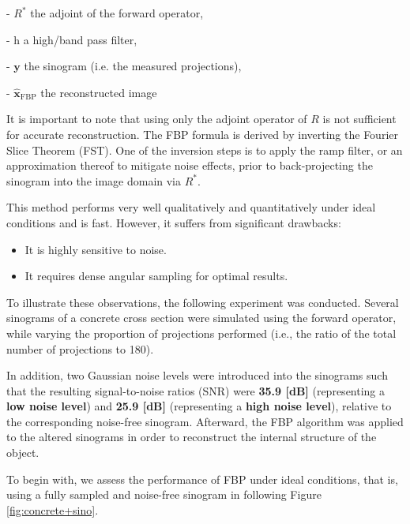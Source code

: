 \documentclass{article}
\begin{document}
- \( R^* \) the adjoint of the forward operator, 

- h a high/band pass filter,

- \( \mathbf{y} \) the sinogram (i.e. the measured projections),

- \( \hat{\mathbf{x}}_{\mathrm{FBP}}\) the reconstructed image

\medskip

It is important to note that using only the adjoint operator of $R$ is not sufficient for accurate reconstruction. The FBP formula is derived by inverting the Fourier Slice Theorem (FST).
One of the inversion steps is to apply the ramp filter, or an approximation thereof to mitigate noise effects, prior to back-projecting the sinogram into the image domain via $R^{*}$.\cite{tan_deep_2024}
\medskip

This method performs very well qualitatively and quantitatively under ideal conditions and is fast. However, it suffers from significant drawbacks:
\begin{itemize}
    \item It is highly sensitive to noise.
    \item It requires dense angular sampling for optimal results.
\end{itemize}

To illustrate these observations, the following experiment was conducted. Several sinograms of a concrete cross section were simulated using the forward operator, while varying the proportion of projections performed (i.e., the ratio of the total number of projections to 180). 

In addition, two Gaussian noise levels were introduced into the sinograms such that the resulting signal-to-noise ratios (SNR) were \textbf{35.9 [dB]} (representing a \textbf{low noise level}) and \textbf{25.9 [dB]} (representing a \textbf{high noise level}), relative to the corresponding noise-free sinogram. Afterward, the FBP algorithm was applied to the altered sinograms in order to reconstruct the internal structure of the object. 
\medskip

To begin with, we assess the performance of FBP under ideal conditions, that is, using a fully sampled and noise-free sinogram in following Figure \ref{fig:concrete+sino}.
\end{document}
